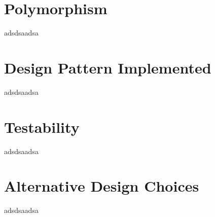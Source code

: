 \documentclass[]{article}
\begin{document}

\vspace*{0.8cm}
\section*{Polymorphism}
adsdsaadsa


\section*{Design Pattern Implemented}
adsdsaadsa


\section*{Testability}
adsdsaadsa


\section*{Alternative Design Choices}
adsdsaadsa

\end{document}
